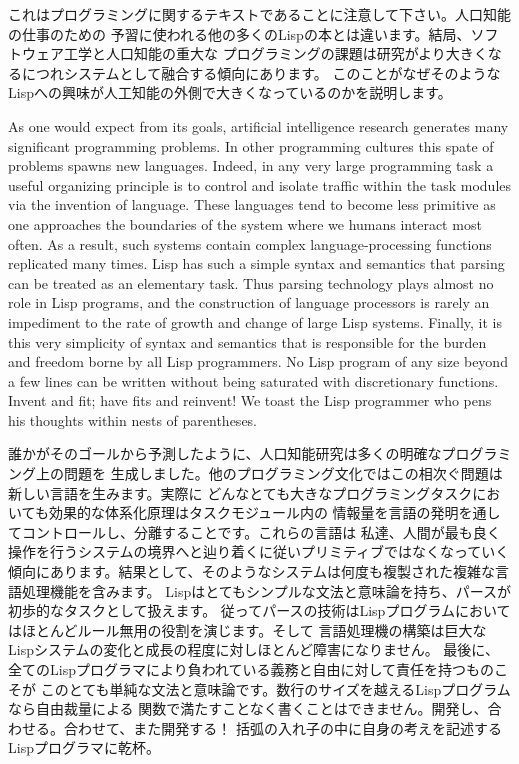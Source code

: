 \documentclass[oneside]{book}
\begin{document}
これはプログラミングに関するテキストであることに注意して下さい。人口知能の仕事のための
予習に使われる他の多くのLispの本とは違います。結局、ソフトウェア工学と人口知能の重大な
プログラミングの課題は研究がより大きくなるにつれシステムとして融合する傾向にあります。
このことがなぜそのようなLispへの興味が人工知能の外側で大きくなっているのかを説明します。

As one would expect from its goals, artificial intelligence research generates
many significant programming problems.  In other programming cultures this
spate of problems spawns new languages.  Indeed, in any very large programming
task a useful organizing principle is to control and isolate traffic within the
task modules via the invention of language.  These languages tend to become
less primitive as one approaches the boundaries of the system where we humans
interact most often.  As a result, such systems contain complex
language-processing functions replicated many times.  Lisp has such a simple
syntax and semantics that parsing can be treated as an elementary task.  Thus
parsing technology plays almost no role in Lisp programs, and the construction
of language processors is rarely an impediment to the rate of growth and change
of large Lisp systems.  Finally, it is this very simplicity of syntax and
semantics that is responsible for the burden and freedom borne by all Lisp
programmers.  No Lisp program of any size beyond a few lines can be written
without being saturated with discretionary functions.  Invent and fit; have
fits and reinvent!  We toast the Lisp programmer who pens his thoughts within
nests of parentheses.

誰かがそのゴールから予測したように、人口知能研究は多くの明確なプログラミング上の問題を
生成しました。他のプログラミング文化ではこの相次ぐ問題は新しい言語を生みます。実際に
どんなとても大きなプログラミングタスクにおいても効果的な体系化原理はタスクモジュール内の
情報量を言語の発明を通してコントロールし、分離することです。これらの言語は
私達、人間が最も良く操作を行うシステムの境界へと辿り着くに従いプリミティブではなくなっていく
傾向にあります。結果として、そのようなシステムは何度も複製された複雑な言語処理機能を含みます。
Lispはとてもシンプルな文法と意味論を持ち、パースが初歩的なタスクとして扱えます。
従ってパースの技術はLispプログラムにおいてはほとんどルール無用の役割を演じます。そして
言語処理機の構築は巨大なLispシステムの変化と成長の程度に対しほとんど障害になりません。
最後に、全てのLispプログラマにより負われている義務と自由に対して責任を持つものこそが
このとても単純な文法と意味論です。数行のサイズを越えるLispプログラムなら自由裁量による
関数で満たすことなく書くことはできません。開発し、合わせる。合わせて、また開発する！
括弧の入れ子の中に自身の考えを記述するLispプログラマに乾杯。
\end{document}
